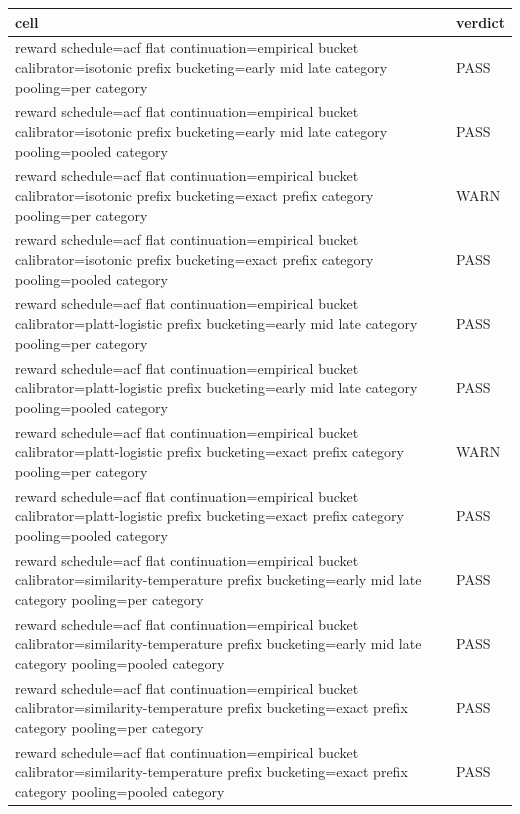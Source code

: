 \begin{table}[h]
\centering
\begin{tabular}{ll}
\hline
cell & verdict \\
\hline
reward schedule=acf flat  continuation=empirical bucket  calibrator=isotonic  prefix bucketing=early mid late  category pooling=per category & PASS \\
reward schedule=acf flat  continuation=empirical bucket  calibrator=isotonic  prefix bucketing=early mid late  category pooling=pooled category & PASS \\
reward schedule=acf flat  continuation=empirical bucket  calibrator=isotonic  prefix bucketing=exact prefix  category pooling=per category & WARN \\
reward schedule=acf flat  continuation=empirical bucket  calibrator=isotonic  prefix bucketing=exact prefix  category pooling=pooled category & PASS \\
reward schedule=acf flat  continuation=empirical bucket  calibrator=platt-logistic  prefix bucketing=early mid late  category pooling=per category & PASS \\
reward schedule=acf flat  continuation=empirical bucket  calibrator=platt-logistic  prefix bucketing=early mid late  category pooling=pooled category & PASS \\
reward schedule=acf flat  continuation=empirical bucket  calibrator=platt-logistic  prefix bucketing=exact prefix  category pooling=per category & WARN \\
reward schedule=acf flat  continuation=empirical bucket  calibrator=platt-logistic  prefix bucketing=exact prefix  category pooling=pooled category & PASS \\
reward schedule=acf flat  continuation=empirical bucket  calibrator=similarity-temperature  prefix bucketing=early mid late  category pooling=per category & PASS \\
reward schedule=acf flat  continuation=empirical bucket  calibrator=similarity-temperature  prefix bucketing=early mid late  category pooling=pooled category & PASS \\
reward schedule=acf flat  continuation=empirical bucket  calibrator=similarity-temperature  prefix bucketing=exact prefix  category pooling=per category & PASS \\
reward schedule=acf flat  continuation=empirical bucket  calibrator=similarity-temperature  prefix bucketing=exact prefix  category pooling=pooled category & PASS \\

\end{tabular}
\end{table}
